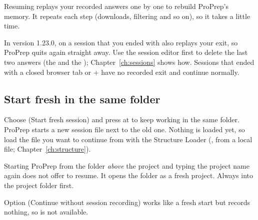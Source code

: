 Resuming replays your recorded answers one by one to rebuild ProPrep's memory.
It repeats each step (downloads, filtering and so on), so it takes a little
time.

\begin{watchout}
In version 1.23.0,  on a session that you ended with
 also replays your exit, so ProPrep quits again straight away. Use the
session editor first to delete the last two answers (the  and the
); Chapter~\ref{ch:sessions} shows how. Sessions that ended with a closed
browser tab or + have no recorded exit and continue normally.
\end{watchout}

\subsection*{Start fresh in the same folder}

Choose  (Start fresh session) and press  at
 to keep working in the same folder. ProPrep starts a
new session file next to the old one. Nothing is loaded yet, so load the file
you want to continue from with the Structure Loader (, from a local
file; Chapter~\ref{ch:structure}).

\begin{watchout}
Starting ProPrep from the folder \emph{above} the project and typing the project
name again does not offer to resume. It opens the folder as a fresh project.
Always  into the project folder first.
\end{watchout}

Option  (Continue without session recording) works like a fresh start
but records nothing, so  is not available.

